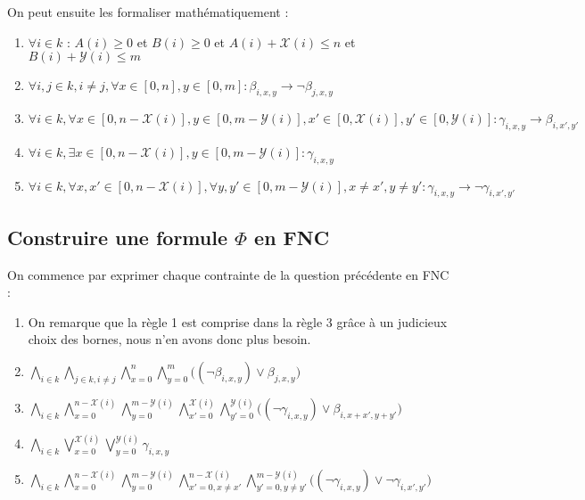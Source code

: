\documentclass[a4paper]{article}
\begin{document}
On peut ensuite les formaliser mathématiquement :
\begin{enumerate}
  \item $\forall i \in k$ : $A(i) \geq 0$ et $B(i) \geq 0$ et $A(i) + \mathcal{X}(i) \leq n$ et $B(i) + \mathcal{Y}(i)\leq m$

  \item $\forall i,j \in k, i \neq j, \forall x \in [0,n], y \in [0,m] : \beta_{i, x, y} \rightarrow \lnot \beta_{j, x, y}$

  \item $
  \forall i \in k,
  \forall x \in [0, n - \mathcal{X}(i)] , y \in [0, m - \mathcal{Y}(i)],
    x' \in [0, \mathcal{X}(i)], y' \in [0, \mathcal{Y}(i)] : \gamma_{i, x, y} \rightarrow \beta_{i, x', y'}
  $

  \item $\forall i \in k, \exists x \in  [0, n - \mathcal{X}(i)], y \in [0, m - \mathcal{Y}(i)] : \gamma_{i, x, y}$
  \item $
  \forall i \in k,
  \forall x,x' \in [0, n - \mathcal{X}(i)],
  \forall y,y' \in [0, m - \mathcal{Y}(i)],
  x \neq x', y \neq y' :
  \gamma_{i, x, y} \rightarrow \lnot \gamma_{i, x', y'}
  $
\end{enumerate}

\subsection{Construire une formule $\Phi$ en FNC}
On commence par exprimer chaque contrainte de la question précédente en FNC :
\begin{enumerate}
  \item On remarque que la règle 1 est comprise dans la règle 3 grâce à un judicieux choix des bornes, nous n'en avons donc plus besoin.

  \item $
  \bigwedge_{i \in k} \bigwedge_{j \in k, i \neq j} \bigwedge_{x=0}^{n} \bigwedge_{y=0}^{m}
  \Big( (\lnot \beta_{i, x, y}) \lor \beta_{j, x, y} \Big)
  $

  \item $
  \bigwedge_{i \in k}
  \bigwedge_{x=0}^{n - \mathcal{X}(i)} \bigwedge_{y=0}^{m - \mathcal{Y}(i)}
  \bigwedge_{x'=0}^{\mathcal{X}(i)} \bigwedge_{y'=0}^{\mathcal{Y}(i)}
  \Big( (\lnot \gamma_{i, x, y}) \lor \beta_{i, x+x', y+y'} \Big)
  $

  \item $
  \bigwedge_{i \in k} \bigvee_{x=0}^{\mathcal{X}(i)} \bigvee_{y=0}^{\mathcal{Y}(i)} \gamma_{i, x, y}
  $

  \item $
  \bigwedge_{i \in k}
  \bigwedge_{x=0}^{n - \mathcal{X}(i)} \bigwedge_{y=0}^{m - \mathcal{Y}(i)}
  \bigwedge_{x'=0, x\neq x'}^{n - \mathcal{X}(i)} \bigwedge_{y'=0, y\neq y'}^{m - \mathcal{Y}(i)}
  \Big( (\lnot \gamma_{i, x, y}) \lor \lnot \gamma_{i, x', y'} \Big)
  $

\end{enumerate}
\vspace{1em}
\end{document}
